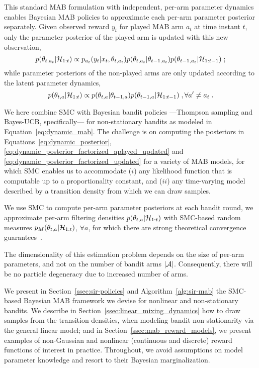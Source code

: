 This standard MAB formulation with independent, per-arm parameter dynamics
enables Bayesian MAB policies to approximate each per-arm parameter posterior separately.
Given observed reward $y_t$ for played MAB arm $a_t$ at time instant $t$,
only the parameter posterior of the played arm is updated with this new observation,
\ie 
\begin{equation}
	p(\theta_{t,a_t}|\mathcal{H}_{1:t}) \propto p_{a_t}(y_t|x_t, \theta_{t,a_t}) p(\theta_{t,a_t} | \theta_{t-1,a_t}) p(\theta_{t-1,a_t}|\mathcal{H}_{1:t-1}) \; ;
	\label{eq:dynamic_posterior_factorized_aplayed_updated}
\end{equation}
while parameter posteriors of the non-played arms are only updated according to the latent parameter dynamics, \ie
\begin{equation}
	p(\theta_{t,a}|\mathcal{H}_{1:t}) \propto p(\theta_{t,a} | \theta_{t-1,a}) p(\theta_{t-1,a}|\mathcal{H}_{1:t-1}) \;, \forall a^\prime \neq a_t \;.
	\label{eq:dynamic_posterior_factorized_updated}
\end{equation}

We here combine SMC with Bayesian bandit policies ---Thompson sampling and Bayes-UCB, specifically---
for non-stationary bandits as modeled in Equation~\eqref{eq:dynamic_mab}.
The challenge is on computing the posteriors in Equations~\eqref{eq:dynamic_posterior}, \eqref{eq:dynamic_posterior_factorized_aplayed_updated} and \eqref{eq:dynamic_posterior_factorized_updated} for a variety of MAB models,
for which SMC enables us to accommodate 
($i$) any likelihood function that is computable up to a proportionality constant, and
($ii$) any time-varying model described by a transition density from which we can draw samples.

We use SMC to compute per-arm parameter posteriors at each bandit round,
\ie we approximate per-arm filtering densities $p(\theta_{t,a}|\mathcal{H}_{1:t})$ with SMC-based random measures $p_M(\theta_{t,a}|\mathcal{H}_{1:t})$, $\forall a$,
for which there are strong theoretical convergence guarantees~\citep{j-Crisan2002,j-Chopin2004}.

The dimensionality of this estimation problem depends on the size of per-arm parameters,
and not on the number of bandit arms $|\mathcal{A}|$.
Consequently, there will be no particle degeneracy due to increased number of arms.

We present in Section~\ref{ssec:sir-policies} and Algorithm~\ref{alg:sir-mab}
the SMC-based Bayesian MAB framework we devise for nonlinear and non-stationary bandits.
We describe in Section~\ref{ssec:linear_mixing_dynamics}
how to draw samples from the transition densities,
when modeling bandit non-stationarity via the general linear model;
and in Section~\ref{ssec:mab_reward_models},
we present examples of
non-Gaussian and nonlinear (continuous and discrete)
reward functions of interest in practice.
Throughout, we avoid assumptions on model parameter knowledge and resort to their Bayesian marginalization.

